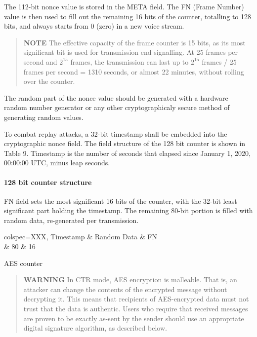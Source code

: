 \documentclass[a4paper,11pt,oneside]{book}
\begin{document}
The 112-bit nonce value is stored in the META field. The FN (Frame Number) value is then used to fill out the remaining 16 bits of the counter, totalling to 128 bits, and always starts from 0 (zero) in a new voice stream.

\begin{quote}
	\textbf{NOTE} The effective capacity of the frame counter is 15 bits, as its most significant bit is used for transmission end signalling. At 25 frames per second and $2^{15}$ frames, the transmission can last up to $2^{15}$ frames / 25 frames per second = 1310 seconds, or almost 22 minutes, without rolling over the counter.
\end{quote}

The random part of the nonce value should be generated with a hardware random number generator or any other cryptographicaly secure method of generating random values.

To combat replay attacks, a 32-bit timestamp shall be embedded into the cryptographic nonce field. The field structure of the 128 bit counter is shown in Table 9. Timestamp is the number of seconds that elapsed since January 1, 2020, 00:00:00 UTC, minus leap seconds.

\paragraph{128 bit counter structure}

FN field sets the most significant 16 bits of the counter, with the 32-bit least significant part holding the timestamp. The remaining 80-bit portion is filled with random data, re-generated per transmission.

\begin{table}[h]
	\centering
	\begin{tblr}{
		colspec={XXX},
		}
		\hline
		Timestamp & Random Data & FN \\
		 & 80 & 16 \\
		\hline[2px]
	\end{tblr}
	\caption{AES counter}
\end{table}

\begin{quote}
	\textbf{WARNING} In CTR mode, AES encryption is malleable. That is, an attacker can change the contents of the encrypted message without decrypting it. This means that recipients of AES-encrypted data must not trust that the data is authentic. Users who require that received messages are proven to be exactly as-sent by the sender should use an appropriate digital signature algorithm, as described below.
\end{quote}
\end{document}
